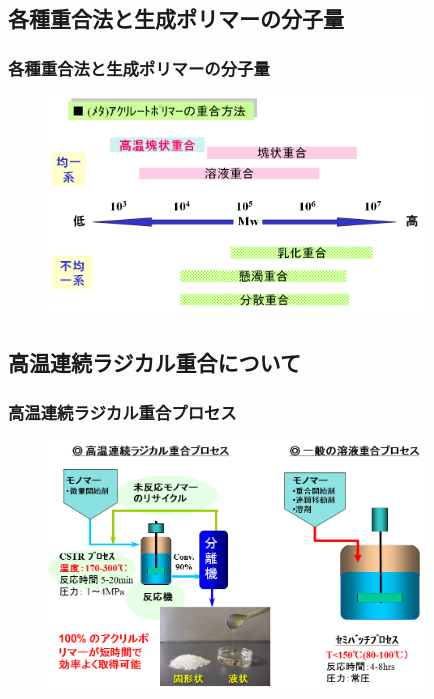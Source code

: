 \documentclass[unicode,12pt]{beamer}%
\begin{document}
\subsection{各種重合法と生成ポリマーの分子量}

\begin{frame}\frametitle{各種重合法と生成ポリマーの分子量}
\begin{figure}[!b]
	\begin{center}
		\includegraphics[width=100mm]{jyuugou_hou.png}
	\end{center}
\end{figure}
\end{frame}

\subsection{高温連続ラジカル重合について}
\begin{frame}\frametitle{高温連続ラジカル重合プロセス}
\begin{figure}[!b]
	\begin{center}
		\includegraphics[width=100mm]{hikaku.png}
	\end{center}
\end{figure}
\end{frame}

\end{document}
